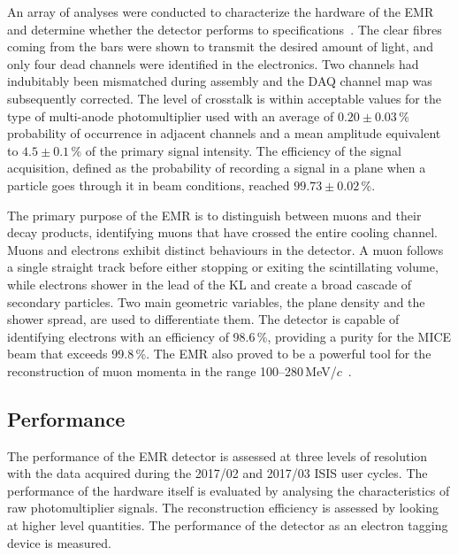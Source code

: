 An array of analyses were conducted to characterize the hardware of the EMR and determine whether the detector performs to specifications~\cite{Drielsma:2017doj}. The clear fibres coming from the bars were shown to transmit the desired amount of light, and only four dead channels were identified in the electronics. Two channels had indubitably been mismatched during assembly and the DAQ channel map was subsequently corrected. The level of crosstalk is within acceptable values for the type of multi-anode photomultiplier used with an average of $0.20\pm0.03$\,\% probability of occurrence in adjacent channels and a mean amplitude equivalent to $4.5\pm0.1$\,\% of the primary signal intensity. The efficiency of the signal acquisition, defined as the probability of recording a signal in a plane when a particle goes through it in beam conditions, reached $99.73\pm0.02$\,\%.

The primary purpose of the EMR is to distinguish between muons and their decay products, identifying
muons that have crossed the entire cooling channel. Muons and electrons exhibit distinct behaviours in the detector. A muon follows a single straight track before either stopping or exiting the scintillating volume, while electrons shower in the lead of the KL and create a broad cascade of secondary particles. Two main geometric variables, the plane density and the shower spread, are used to differentiate them. The detector is capable of identifying electrons with an efficiency of 98.6\,\%, providing a purity for the MICE beam that exceeds 99.8\,\%. The EMR also proved to be a powerful tool for the reconstruction of muon momenta in the range 100--280\,MeV/$c$~\cite{2015JInst..10P2012A}.

\subsection{Performance}
\label{SubSect:EMR_Performance}

The performance of the EMR detector is assessed at three levels of resolution with the data acquired during the 2017/02 and 2017/03 ISIS user cycles. The performance of the hardware itself is evaluated by analysing the characteristics of raw photomultiplier signals. The reconstruction efficiency is assessed by looking at higher level quantities. The performance of the detector as an electron tagging device is measured.

